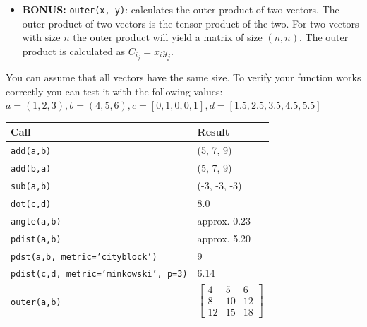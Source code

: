 \begin{itemize}
{\begin{python}
\end{python}
}
  \item \textbf{BONUS:} \texttt{outer(x, y)}: calculates the outer product of two vectors. The outer product of two vectors is the tensor product of the two. For two vectors with size $n$ the outer product will yield a matrix of size $(n, n)$.
  The outer product is calculated as $C_{i_j} = x_iy_j$.
  \cprotect{}
\end{itemize}
You can assume that all vectors have the same size. To verify your function works correctly you can test it with the following values:\\
$a = (1, 2, 3), b = (4, 5, 6), c = [0, 1, 0, 0, 1], d = [1.5, 2.5, 3.5, 4.5, 5.5]$\\
\begin{tabular}{|ll|}
  \hline
  Call & Result \\
  \hline
  \texttt{add(a,b)} & (5, 7, 9)\\
  \texttt{add(b,a)} & (5, 7, 9)\\
  \texttt{sub(a,b)} & (-3, -3, -3)\\
  \texttt{dot(c,d)} & 8.0\\
  \texttt{angle(a,b)} & approx. 0.23\\
  \texttt{pdist(a,b)} & approx. 5.20\\
  \texttt{pdst(a,b, metric='cityblock')} & 9\\
  \texttt{pdist(c,d, metric='minkowski', p=3)} & 6.14\\
  \texttt{outer(a,b)} & $\left[\begin{matrix} 4 & 5 & 6\\ 8 & 10 & 12\\ 12 & 15 & 18 \end{matrix}\right]$\\
  \hline
\end{tabular}
